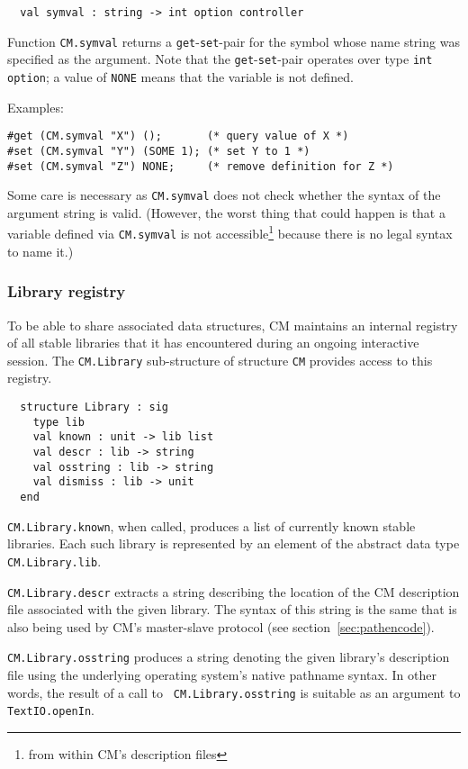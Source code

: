 \documentclass{article}
\begin{document}
\begin{verbatim}
  val symval : string -> int option controller
\end{verbatim}

Function {\tt CM.symval} returns a {\tt get}-{\tt set}-pair for the
symbol whose name string was specified as the argument.  Note that the
{\tt get}-{\tt set}-pair operates over type {\tt int option}; a value
of {\tt NONE} means that the variable is not defined.

\noindent Examples:
\begin{verbatim}
#get (CM.symval "X") ();       (* query value of X *)
#set (CM.symval "Y") (SOME 1); (* set Y to 1 *)
#set (CM.symval "Z") NONE;     (* remove definition for Z *)
\end{verbatim}

Some care is necessary as {\tt CM.symval} does not check whether the
syntax of the argument string is valid.  (However, the worst thing
that could happen is that a variable defined via {\tt CM.symval} is
not accessible\footnote{from within CM's description files} because
there is no legal syntax to name it.)

\subsubsection*{Library registry}

To be able to share associated data structures, CM maintains an
internal registry of all stable libraries that it has encountered
during an ongoing interactive session.  The {\tt CM.Library}
sub-structure of structure {\tt CM} provides access to this registry.

\begin{verbatim}
  structure Library : sig
    type lib
    val known : unit -> lib list
    val descr : lib -> string
    val osstring : lib -> string
    val dismiss : lib -> unit
  end
\end{verbatim}

{\tt CM.Library.known}, when called, produces a list of currently
known stable libraries.  Each such library is represented by an
element of the abstract data type {\tt CM.Library.lib}.

{\tt CM.Library.descr} extracts a string describing the location of
the CM description file associated with the given library.  The syntax
of this string is the same that is also being used by CM's
master-slave protocol (see section~\ref{sec:pathencode}).

{\tt CM.Library.osstring} produces a string denoting the given
library's description file using the underlying operating system's
native pathname syntax.  In other words, the result of a call to {\tt
CM.Library.osstring} is suitable as an argument to {\tt
TextIO.openIn}.
\end{document}
